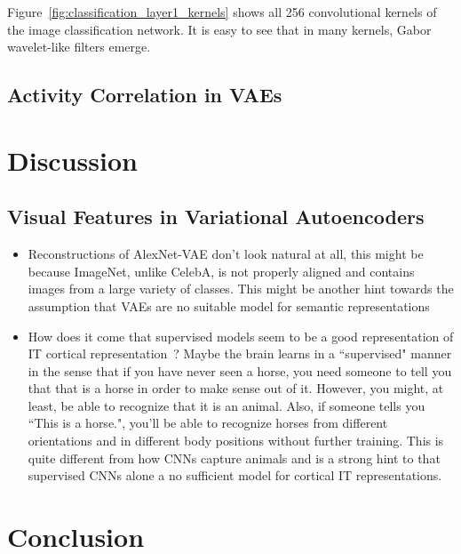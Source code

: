 \documentclass[11pt]{article}
\begin{document}
    Figure~\ref{fig:classification_layer1_kernels} shows all 256 convolutional kernels of the image classification network.
    It is easy to see that in many kernels, Gabor wavelet-like filters emerge.

    \subsection{Activity Correlation in \acp{VAE}}\label{subsec:results_activity-correlation-in-vaes}


    \section{Discussion}\label{sec:discussion}

    \subsection{Visual Features in Variational Autoencoders}\label{subsec:discussion_visual_features_in_variational_autoencoders}
    \begin{itemize}
        \item Reconstructions of AlexNet-VAE don't look natural at all, this might be because ImageNet, unlike CelebA, is not properly aligned and contains images from a large variety of classes.
        This might be another hint towards the assumption that \acp{VAE} are no suitable model for semantic representations
        \item How does it come that supervised models seem to be a good representation of \ac{IT} cortical representation~\citep{khaligh2014deep}? Maybe the brain learns in a ``supervised" manner in the sense that if you have never seen a horse, you need someone to tell you that that is a horse in order to make sense out of it.
        However, you might, at least, be able to recognize that it is an animal.
        Also, if someone tells you ``This is a horse.", you'll be able to recognize horses from different orientations and in different body positions without further training.
        This is quite different from how \acp{CNN} capture animals and is a strong hint to that supervised \acp{CNN} alone a no sufficient model for cortical IT representations.
    \end{itemize}


    \section{Conclusion}\label{sec:conclusion}
\end{document}
